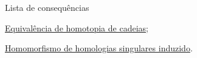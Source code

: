 \begin{titlemize}{Lista de consequências}
    \item \hyperref[equivalencia-de-homotopia-de-cadeias-def]{Equivalência de homotopia de cadeias};\\
    \item \hyperref[homomorfismo-de-homologias-singulares-induzido-prop]{Homomorfismo de homologias singulares induzido}.
\end{titlemize}
